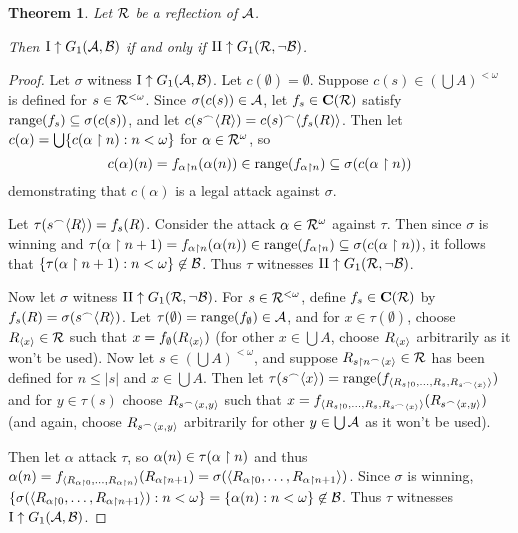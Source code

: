 \documentclass{amsart}
\theoremstyle{plain}
\newtheorem{theorem}{Theorem}
\theoremstyle{definition}
\theoremstyle{remark}
\theoremstyle{plain}
\theoremstyle{definition}
\theoremstyle{remark}
\begin{document}
\begin{theorem}
  Let \(\mathcal{R}\) be a reflection of \(\mathcal{A}\). 

  Then
  \(\mathrm{I}\uparrow G_{1}(\mathcal{A},\mathcal{B})\) if and only if
  \(\mathrm{II}\uparrow G_{1}(\mathcal{R},\neg\mathcal{B})\).
\end{theorem}

\begin{proof}
  Let \(\sigma\) witness 
  \(\mathrm{I}\uparrow G_{1}(\mathcal{A},\mathcal{B})\).
  Let \(c(\emptyset)=\emptyset\). Suppose 
  \(c(s)\in(\bigcup A)^{<\omega}\)
  is defined for \(s\in\mathcal{R}^{<\omega}\). Since \(\sigma(c(s))\in\mathcal{A}\),
  let \(f_s\in\mathbf C(\mathcal{R})\) satisfy \(\text{range}(f_s)\subseteq\sigma(c(s))\),
  and let \(c(s{^\frown}\langle R\rangle)=c(s){^\frown}\langle f_s(R)\rangle\).
  Then let \(c(\alpha)=\bigcup\{c(\alpha\restriction n):n<\omega\}\)
  for \(\alpha\in\mathcal{R}^\omega\), so
  \[
    c(\alpha)(n)
      =
    f_{\alpha\restriction n}(\alpha(n))
      \in
    \text{range}(f_{\alpha\restriction n})
      \subseteq
    \sigma(c(\alpha\restriction n))
  \]
  demonstrating that \(c(\alpha)\) is a legal attack against \(\sigma\).

  Let \(\tau(s{^\frown}\langle R\rangle)=f_s(R)\). Consider the attack \(\alpha\in\mathcal{R}^\omega\)
  against \(\tau\). Then since \(\sigma\) is winning and
  \(
    \tau(\alpha\restriction n+1)=f_{\alpha\restriction n}(\alpha(n))\in
    \text{range}(f_{\alpha\restriction n})\subseteq\sigma(c(\alpha\restriction n))
  \), it follows that \(\{\tau(\alpha\restriction n+1):n<\omega\}\not\in\mathcal{B}\).
  Thus \(\tau\) witnesses
  \(\mathrm{II}\uparrow G_{1}(\mathcal{R},\neg\mathcal{B})\).

  Now let \(\sigma\) witness
  \(\mathrm{II}\uparrow G_{1}(\mathcal{R},\neg\mathcal{B})\).
  For \(s\in \mathcal{R}^{<\omega}\), define \(f_s\in\mathbf C(\mathcal{R})\)
  by \(f_s(R)=\sigma(s{^\frown}\langle R\rangle)\). Let \(\tau(\emptyset)=\text{range}(f_\emptyset)\in\mathcal{A}\),
  and for \(x\in\tau(\emptyset)\), choose \(R_{\langle x\rangle}\in\mathcal{R}\) such that
  \(x=f_{\emptyset}(R_{\langle x\rangle})\) (for other \(x\in\bigcup A\), choose \(R_{\langle x\rangle}\)
  arbitrarily as it won't be used). Now let \(s\in(\bigcup A)^{<\omega}\),
  and suppose \(R_{s\restriction n{^\frown}\langle x\rangle}\in\mathcal{R}\) has been defined for
  \(n\leq|s|\) and \(x\in\bigcup A\). 
  Then let \(\tau(s{^\frown}\langle x\rangle)=\text{range}(f_{\langle R_{s\restriction 0},\dots,R_s,R_{s{^\frown}\langle x\rangle}\rangle})\)
  and for \(y\in\tau(s)\) choose \(R_{s{^\frown}\langle x,y\rangle}\) such that
  \(x=f_{\langle R_{s\restriction 0},\dots,R_s,R_{s{^\frown}\langle x\rangle}\rangle}(R_{s{^\frown}\langle x,y\rangle})\) (and again,
  choose \(R_{s{^\frown}\langle x,y\rangle}\) arbitrarily for other \(y\in\bigcup\mathcal{A}\) as it won't be used).

  Then let \(\alpha\) attack \(\tau\), so
  \(\alpha(n)\in\tau(\alpha\restriction n)\) and thus 
  \(\alpha(n)=f_{\langle R_{\alpha\restriction 0},\dots,R_{\alpha\restriction n}\rangle}(R_{\alpha\restriction n+1})
  =\sigma(\langle R_{\alpha\restriction 0},\dots,R_{\alpha\restriction n+1}\rangle)\).  Since \(\sigma\) is winning,
  \(\{\sigma(\langle R_{\alpha\restriction 0},\dots,R_{\alpha\restriction n+1}\rangle):n<\omega\}
  =\{\alpha(n):n<\omega\}\not\in\mathcal{B}\).
  Thus \(\tau\) witnesses
  \(\mathrm{I}\uparrow G_{1}(\mathcal{A},\mathcal{B})\).
\end{proof}
\end{document}
